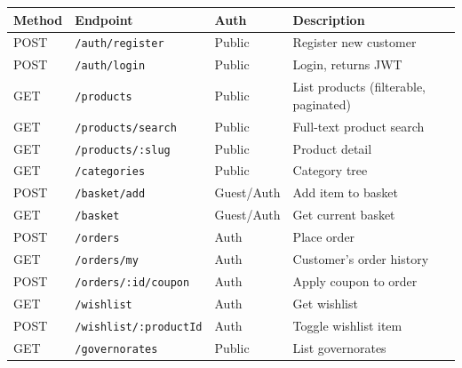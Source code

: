 \begin{longtable}{|m{1.5cm}|m{4.5cm}|m{2cm}|m{6cm}|}
    \hline
    \textbf{Method} & \textbf{Endpoint}                        & \textbf{Auth} & \textbf{Description}                  \\
    \hline
    \endhead
    \endfoot
    \endlastfoot
    \hline
    POST            & \texttt{/auth/register}                  & Public        & Register new customer                 \\
    \hline
    POST            & \texttt{/auth/login}                     & Public        & Login, returns JWT                    \\
    \hline
    GET             & \texttt{/products}                       & Public        & List products (filterable, paginated) \\
    \hline
    GET             & \texttt{/products/search}                & Public        & Full-text product search              \\
    \hline
    GET             & \texttt{/products/:slug}                 & Public        & Product detail                        \\
    \hline
    GET             & \texttt{/categories}                     & Public        & Category tree                         \\
    \hline
    POST            & \texttt{/basket/add}                     & Guest/Auth    & Add item to basket                    \\
    \hline
    GET             & \texttt{/basket}                         & Guest/Auth    & Get current basket                    \\
    \hline
    POST            & \texttt{/orders}                         & Auth          & Place order                           \\
    \hline
    GET             & \texttt{/orders/my}                      & Auth          & Customer's order history              \\
    \hline
    POST            & \texttt{/orders/:id/coupon}              & Auth          & Apply coupon to order                 \\
    \hline
    GET             & \texttt{/wishlist}                       & Auth          & Get wishlist                          \\
    \hline
    POST            & \texttt{/wishlist/:productId}            & Auth          & Toggle wishlist item                  \\
    \hline
    GET             & \texttt{/governorates}                   & Public        & List governorates                     \\

\end{longtable}
